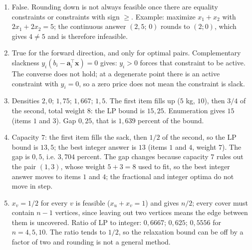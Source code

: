 \begin{enumerate}[label=\textbf{24.\arabic*}]
  \item False. Rounding down is not always feasible once there are equality
        constraints or constraints with sign $\ge$. Example: maximize $x_{1}+x_{2}$ with
        $2x_{1}+2x_{2}=5$; the continuous answer $(2{,}5;\,0)$ rounds to
        $(2;0)$, which gives $4\ne5$ and is therefore infeasible.

  \item True for the forward direction, and only for optimal pairs. Complementary
        slackness $y_{i}(b_{i}-\mathbf{a}_{i}^{\top}\mathbf{x})=0$ gives:
        $y_{i}>0$ forces that constraint to be active. The converse does not hold; at a
        degenerate point there is an active constraint with $y_{i}=0$, so a zero price
        does not mean the constraint is slack.

  \item Densities $2{,}0$; $1{,}75$; $1{,}667$; $1{,}5$. The first item fills up
        ($5$ kg, $10$), then $3/4$ of the second, total weight $8$: the LP bound
        is $15{,}25$. Enumeration gives $15$ (items $1$ and $3$). Gap $0{,}25$,
        that is $1{,}639$ percent of the bound.

  \item 
Capacity $7$: the first item fills the sack, then $1/2$ of the second, so
        the LP bound is $13{,}5$; the best integer answer is $13$ (items $1$ and
        $4$, weight $7$). The gap is $0{,}5$, i.e. $3{,}704$ percent. The gap
        changes because capacity $7$ rules out the pair $(1,3)$, whose weight
        $5+3=8$ used to fit, so the best integer answer moves to items $1$ and $4$;
        the fractional and integer optima do not move in step.

  \item $x_{v}=1/2$ for every $v$ is feasible ($x_{u}+x_{v}=1$) and gives $n/2$;
        every cover must contain $n-1$ vertices, since leaving out two vertices
        means the edge between them is uncovered. Ratio of LP to integer:
        $0{,}6667$; $0{,}625$; $0{,}5556$ for $n=4,5,10$. The ratio tends to
        $1/2$, so the relaxation bound can be off by a factor of two and rounding is not
        a general method.
\end{enumerate}

